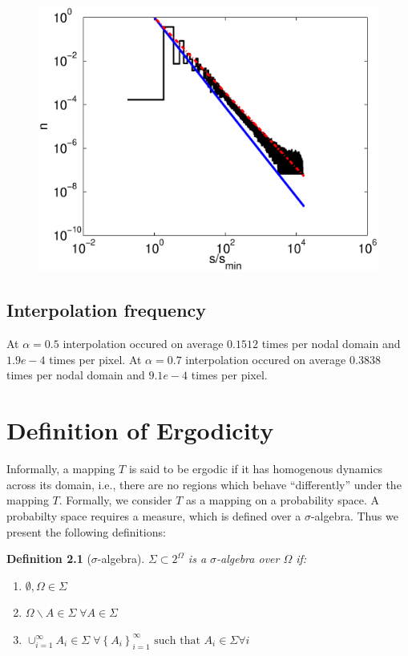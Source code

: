 \documentclass{report}
\begin{document}
\begin{figure}
  \begin{center}
    \includegraphics[width=\textwidth]{figs/results/perc_100_to_2000_sizes.eps}
  \end{center}
\end{figure}


\section{Interpolation frequency}
At $\alpha = 0.5$ interpolation occured on average $0.1512$ times per nodal domain and $1.9e-4$ times per pixel.
At $\alpha = 0.7$ interpolation occured on average $0.3838$ times per nodal domain and $9.1e-4$ times per pixel.


\appendix
\chapter{Definition of Ergodicity}
\label{sec:ergodicity}

Informally, a mapping $T$ is said to be ergodic if it has homogenous dynamics across its domain, i.e., there are no regions which behave ``differently'' under the mapping $T$. Formally, we consider $T$ as a mapping on a probability space. A probabilty space requires a measure, which is defined over a $\sigma$-algebra. Thus we present the following definitions:

\newtheorem{dfn}{Definition}
\begin{dfn}[$\sigma$-algebra]
$\Sigma \subset 2^{\Omega}$ is a \emph{$\sigma$-algebra} over $\Omega$ if:
\begin{enumerate}
\item
$\emptyset, \Omega \in \Sigma$
\item
$\Omega \backslash A \in \Sigma \; \forall A \in \Sigma$
\item
$\cup_{i=1}^{\infty}A_{i} \in \Sigma \; \forall \left\{A_{i}\right\}_{i=1}^{\infty}\text{ such that }A_{i} \in \Sigma \forall i$
\end{enumerate}
\end{dfn}
\end{document}
